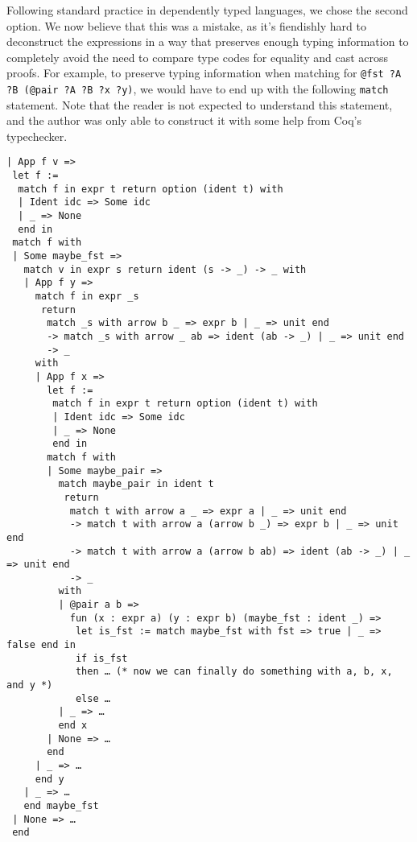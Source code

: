 Following standard practice in dependently typed languages, we chose the second option.
We now believe that this was a mistake, as it's fiendishly hard to deconstruct the expressions in a way that preserves enough typing information to completely avoid the need to compare type codes for equality and cast across proofs.
For example, to preserve typing information when matching for \texttt{@fst ?A ?B (@pair ?A ?B ?x ?y)}, we would have to end up with the following \texttt{match} statement.
Note that the reader is not expected to understand this statement, and the author was only able to construct it with some help from Coq's typechecker.
\begin{verbatim}
| App f v =>
 let f :=
  match f in expr t return option (ident t) with
  | Ident idc => Some idc
  | _ => None
  end in
 match f with
 | Some maybe_fst =>
   match v in expr s return ident (s -> _) -> _ with
   | App f y =>
     match f in expr _s
      return
       match _s with arrow b _ => expr b | _ => unit end
       -> match _s with arrow _ ab => ident (ab -> _) | _ => unit end
       -> _
     with
     | App f x =>
       let f :=
        match f in expr t return option (ident t) with
        | Ident idc => Some idc
        | _ => None
        end in
       match f with
       | Some maybe_pair =>
         match maybe_pair in ident t
          return
           match t with arrow a _ => expr a | _ => unit end
           -> match t with arrow a (arrow b _) => expr b | _ => unit end
           -> match t with arrow a (arrow b ab) => ident (ab -> _) | _ => unit end
           -> _
         with
         | @pair a b =>
           fun (x : expr a) (y : expr b) (maybe_fst : ident _) =>
            let is_fst := match maybe_fst with fst => true | _ => false end in
            if is_fst
            then … (* now we can finally do something with a, b, x, and y *)
            else …
         | _ => …
         end x
       | None => …
       end
     | _ => …
     end y
   | _ => …
   end maybe_fst
 | None => …
 end
\end{verbatim}
